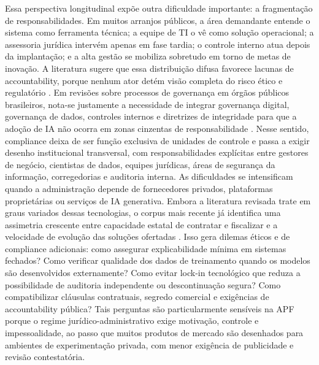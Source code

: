 \documentclass[12pt,a4paper]{article}
\begin{document}
Essa perspectiva longitudinal expõe outra dificuldade importante: a fragmentação de responsabilidades. Em muitos arranjos públicos, a área demandante entende o sistema como ferramenta técnica; a equipe de TI o vê como solução operacional; a assessoria jurídica intervém apenas em fase tardia; o controle interno atua depois da implantação; e a alta gestão se mobiliza sobretudo em torno de metas de inovação. A literatura sugere que essa distribuição difusa favorece lacunas de accountability, porque nenhum ator detém visão completa do risco ético e regulatório \autocite{criado2024artificial} \autocite{goulart2025processos}. Em revisões sobre processos de governança em órgãos públicos brasileiros, nota-se justamente a necessidade de integrar governança digital, governança de dados, controles internos e diretrizes de integridade para que a adoção de IA não ocorra em zonas cinzentas de responsabilidade \autocite{goulart2025processos}. Nesse sentido, compliance deixa de ser função exclusiva de unidades de controle e passa a exigir desenho institucional transversal, com responsabilidades explícitas entre gestores de negócio, cientistas de dados, equipes jurídicas, áreas de segurança da informação, corregedorias e auditoria interna.
As dificuldades se intensificam quando a administração depende de fornecedores privados, plataformas proprietárias ou serviços de IA generativa. Embora a literatura revisada trate em graus variados dessas tecnologias, o corpus mais recente já identifica uma assimetria crescente entre capacidade estatal de contratar e fiscalizar e a velocidade de evolução das soluções ofertadas \autocite{mariano2026inteligencia} \autocite{lyrio2025emerging}. Isso gera dilemas éticos e de compliance adicionais: como assegurar explicabilidade mínima em sistemas fechados? Como verificar qualidade dos dados de treinamento quando os modelos são desenvolvidos externamente? Como evitar lock-in tecnológico que reduza a possibilidade de auditoria independente ou descontinuação segura? Como compatibilizar cláusulas contratuais, segredo comercial e exigências de accountability pública? Tais perguntas são particularmente sensíveis na APF porque o regime jurídico-administrativo exige motivação, controle e impessoalidade, ao passo que muitos produtos de mercado são desenhados para ambientes de experimentação privada, com menor exigência de publicidade e revisão contestatória.
\end{document}
